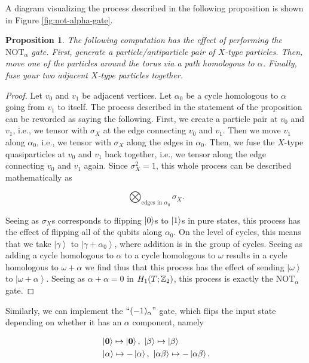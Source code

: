 \documentclass{article}
\newtheorem{proposition}{Proposition}[section]
\theoremstyle{definition}
\numberwithin{figure}{section}
\begin{document}
A diagram visualizing the process described in the following proposition is shown in Figure \ref{fig:not-alpha-gate}.

\begin{proposition} The following computation has the effect of performing the $\text{NOT}_{\alpha}$ gate. First, generate a particle/antiparticle pair of $X$-type particles. Then, move one of the particles around the torus via a path homologous to $\alpha$. Finally, fuse your two adjacent $X$-type particles together.
\end{proposition}
\begin{proof} Let $v_0$ and $v_1$ be adjacent vertices. Let $\alpha_0$ be a cycle homologous to $\alpha$ going from $v_1$ to itself. The process described in the statement of the proposition can be reworded as saying the following. First, we create a particle pair at $v_0$ and $v_1$, i.e., we tensor with $\sigma_X$ at the edge connecting $v_0$ and $v_1$. Then we move $v_1$ along $\alpha_0$, i.e., we tensor with $\sigma_X$ along the edges in $\alpha_0$. Then, we fuse the $X$-type quasiparticles at $v_0$ and $v_1$ back together, i.e., we tensor along the edge connecting $v_0$ and $v_1$ again. Since $\sigma_X^2=1$, this whole process can be described mathematically as

$$\bigotimes_{\text{edges in }\alpha_0}\sigma_X.$$

Seeing as $\sigma_X$s corresponds to flipping $\left|0\right>$s to $\left|1\right>$s in pure states, this process has the effect of flipping all of the qubits along $\alpha_0$. On the level of cycles, this means that we take $\left|\gamma\right>$ to $\left|\gamma+\alpha_0\right>$, where addition is in the group of cycles. Seeing as adding a cycle homologous to $\alpha$ to a cycle homologous to $\omega$ results in a cycle homologous to $\omega+\alpha$ we find thus that this process has the effect of sending $\left|\omega\right>$ to $\left|\omega+\alpha\right>$. Seeing as $\alpha+\alpha=0$ in $H_1(T;\mathbb{Z}_2)$, this process is exactly the $\text{NOT}_{\alpha}$ gate.
\end{proof}

Similarly, we can implement the $``(-1)_{\alpha}"$ gate, which flips the input state depending on whether it has an $\alpha$ component, namely

\begin{align*}
&\left|\bold{0}\right> \mapsto \left|\bold{0}\right>,\,\,  \left|\beta\right> \mapsto \left|\beta\right> \\
&\left|\alpha\right> \mapsto -\left|\alpha\right>,\,\, \left|\alpha\beta\right> \mapsto -\left|\alpha\beta\right>.
\end{align*}
\end{document}
